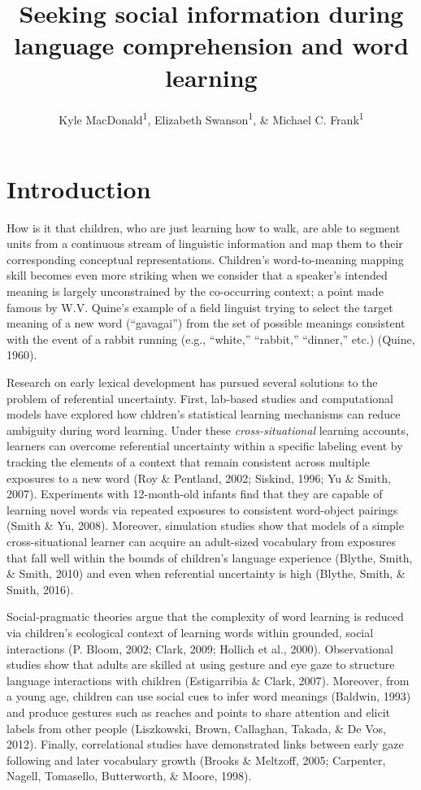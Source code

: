 \documentclass[man,floatsintext]{apa6}
\title{Seeking social information during language comprehension and word
learning}
\author{Kyle MacDonald\textsuperscript{1}, Elizabeth Swanson\textsuperscript{1},
\& Michael C. Frank\textsuperscript{1}}
\date{}
\affiliation{
\vspace{0.5cm}
\textsuperscript{1} Stanford University}
\begin{document}
\maketitle

\section{Introduction}\label{introduction}

How is it that children, who are just learning how to walk, are able to
segment units from a continuous stream of linguistic information and map
them to their corresponding conceptual representations. Children's
word-to-meaning mapping skill becomes even more striking when we
consider that a speaker's intended meaning is largely unconstrained by
the co-occurring context; a point made famous by W.V. Quine's example of
a field linguist trying to select the target meaning of a new word
(\enquote{gavagai}) from the set of possible meanings consistent with
the event of a rabbit running (e.g., \enquote{white,} \enquote{rabbit,}
\enquote{dinner,} etc.) (Quine, 1960).

Research on early lexical development has pursued several solutions to
the problem of referential uncertainty. First, lab-based studies and
computational models have explored how chldren's statistical learning
mechanisms can reduce ambiguity during word learning. Under these
\emph{cross-situational} learning accounts, learners can overcome
referential uncertainty within a specific labeling event by tracking the
elements of a context that remain consistent across multiple exposures
to a new word (Roy \& Pentland, 2002; Siskind, 1996; Yu \& Smith, 2007).
Experiments with 12-month-old infants find that they are capable of
learning novel words via repeated exposures to consistent word-object
pairings (Smith \& Yu, 2008). Moreover, simulation studies show that
models of a simple cross-situational learner can acquire an adult-sized
vocabulary from exposures that fall well within the bounds of children's
language experience (Blythe, Smith, \& Smith, 2010) and even when
referential uncertainty is high (Blythe, Smith, \& Smith, 2016).

Social-pragmatic theories argue that the complexity of word learning is
reduced via children's ecological context of learning words within
grounded, social interactions (P. Bloom, 2002; Clark, 2009; Hollich et
al., 2000). Observational studies show that adults are skilled at using
gesture and eye gaze to structure language interactions with children
(Estigarribia \& Clark, 2007). Moreover, from a young age, children can
use social cues to infer word meanings (Baldwin, 1993) and produce
gestures such as reaches and points to share attention and elicit labels
from other people (Liszkowski, Brown, Callaghan, Takada, \& De Vos,
2012). Finally, correlational studies have demonstrated links between
early gaze following and later vocabulary growth (Brooks \& Meltzoff,
2005; Carpenter, Nagell, Tomasello, Butterworth, \& Moore, 1998).
\end{document}
